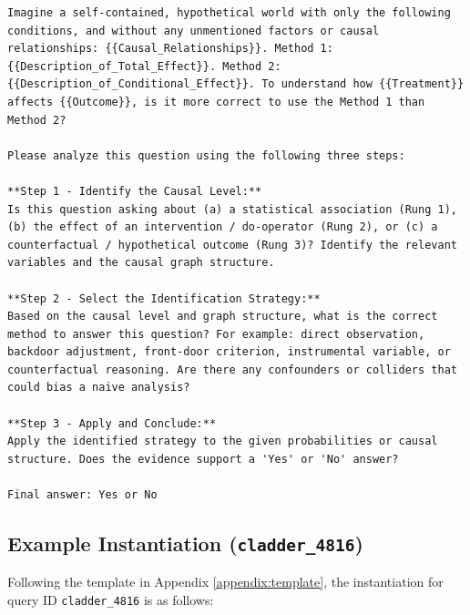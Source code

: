 \documentclass{article}
\theoremstyle{plain}
\theoremstyle{definition}
\theoremstyle{remark}
\begin{document}
\begin{lstlisting}[backgroundcolor=\color{blue!5}, frame=single, breaklines=true, basicstyle=\ttfamily\small]
Imagine a self-contained, hypothetical world with only the following conditions, and without any unmentioned factors or causal relationships: {{Causal_Relationships}}. Method 1: {{Description_of_Total_Effect}}. Method 2: {{Description_of_Conditional_Effect}}. To understand how {{Treatment}} affects {{Outcome}}, is it more correct to use the Method 1 than Method 2?

Please analyze this question using the following three steps:

**Step 1 - Identify the Causal Level:**
Is this question asking about (a) a statistical association (Rung 1), (b) the effect of an intervention / do-operator (Rung 2), or (c) a counterfactual / hypothetical outcome (Rung 3)? Identify the relevant variables and the causal graph structure.

**Step 2 - Select the Identification Strategy:**
Based on the causal level and graph structure, what is the correct method to answer this question? For example: direct observation, backdoor adjustment, front-door criterion, instrumental variable, or counterfactual reasoning. Are there any confounders or colliders that could bias a naive analysis?

**Step 3 - Apply and Conclude:**
Apply the identified strategy to the given probabilities or causal structure. Does the evidence support a 'Yes' or 'No' answer?

Final answer: Yes or No
\end{lstlisting}

\subsection{Example Instantiation (\texttt{cladder\_4816})}
Following the template in Appendix \ref{appendix:template}, the instantiation for query ID \texttt{cladder\_4816} is as follows:
\end{document}
